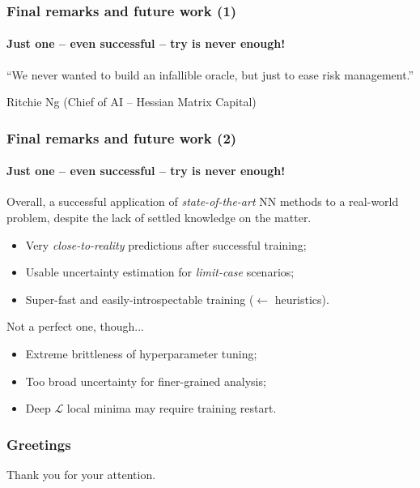\documentclass{beamer}
\begin{document}
{\begin{frame}
\end{frame}
\begin{frame}
	\frametitle{Final remarks and future work (1)}
	\framesubtitle{Just one -- even successful -- try is never enough!}

	\begin{displayquote}
		“We never wanted to build an infallible oracle, but just to ease risk management.”
		\begin{flushright}Ritchie Ng (Chief of AI -- Hessian Matrix Capital) \end{flushright}
	\end{displayquote}

\end{frame}


\begin{frame}
	\frametitle{Final remarks and future work (2)}
	\framesubtitle{Just one -- even successful -- try is never enough!}

	Overall, a successful application of \textit{state-of-the-art} NN methods to a real-world problem, despite the lack of settled knowledge on the matter.
	\hfill \break
	\begin{itemize}
		\item{Very \textit{close-to-reality} predictions after successful training;}
		\item{Usable uncertainty estimation for \textit{limit-case} scenarios;}
		\item{Super-fast and easily-introspectable training ($\leftarrow$ heuristics).}
	\end{itemize}
	\hfill \break
	Not a perfect one, though...
	\hfill \break
	\begin{itemize}
		\item{Extreme brittleness of hyperparameter tuning;}
		\item{Too broad uncertainty for finer-grained analysis;}
		\item{Deep $\mathcal{L}$ local minima may require training restart.}
	\end{itemize}

\end{frame}
}

\begin{frame}
	\frametitle{Greetings}
	Thank you for your attention.
\end{frame}

\end{document}
